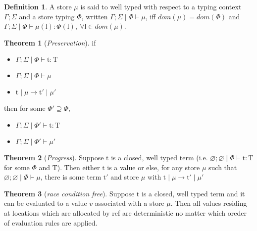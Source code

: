 \documentclass[10pt]{article}
\newcommand{\lto}{\longrightarrow}
\newcommand{\context}{\Gamma;\Sigma\mid\Phi}
\let\emptyset\varnothing
\theoremstyle{definition}\newtheorem*{theorem}{Theorem}
\theoremstyle{definition}\newtheorem*{definition}{Definition}
\begin{document}
    \newpage
    \begin{definition}
        A store $\mu$ is said to well typed with respect to a typing context $\Gamma;\Sigma$ and a store typing $\Phi$,
        written $\context\vdash\mu$, iff $dom(\mu) = dom(\Phi)$ and $\context\vdash \mu(\mathrm{l})\colon\Phi(\mathrm{l}),\ \forall \mathrm{l} \in dom(\mu)$.
    \end{definition}
    \begin{theorem}[{\it Preservation}]
        if 
        \begin{itemize}
            \item[] $\context\vdash\mathrm{t}\colon\mathrm{T}$
            \item[] $\context\vdash\mu$
            \item[] $\mathrm{t}\mid\mu\lto\mathrm{t'}\mid\mu'$
        \end{itemize}
        then for some $\Phi'\supseteq\Phi$,
        \begin{itemize}
            \item[] $\Gamma;\Sigma\mid\Phi'\vdash\mathrm{t}\colon\mathrm{T}$
            \item[] $\Gamma;\Sigma\mid\Phi'\vdash\mu'$
        \end{itemize}
    \end{theorem}
    \begin{theorem}[{\it Progress}]
        Suppose $\mathrm{t}$ is a closed, well typed term 
        (i.e. $\emptyset;\emptyset\mid\Phi\vdash\mathrm{t}\colon\mathrm{T}$ for some $\Phi$ and $\mathrm{T}$). 
        Then either $\mathrm{t}$ is a value or else, for any store $\mu$ such that $\emptyset;\emptyset\mid\Phi\vdash\mu$, 
        there is some term $\mathrm{t'}$ and store $\mu$ with $\mathrm{t}\mid\mu\lto\mathrm{t'}\mid\mu'$
    \end{theorem}
    \begin{theorem}[{\it race condition free}]
        Suppose $\mathrm{t}$ is a closed, well typed term and it can be evaluated to a value $v$ associated with a store $\mu$. Then all values residing at locations which are allocated by ref are deterministic no matter which oreder of evaluation rules are applied.
    \end{theorem}
\end{document}
